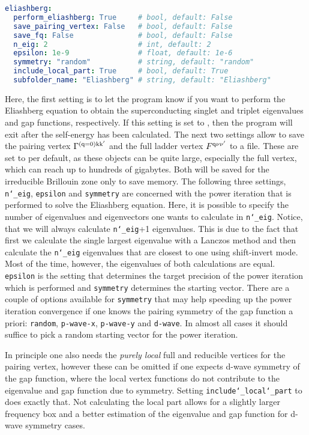 \documentclass[../../main.tex]{subfiles}
\begin{document}
\begin{minipage}{\textwidth}%
\begin{lstlisting}[language=yaml]
eliashberg:
  perform_eliashberg: True     # bool, default: False
  save_pairing_vertex: False   # bool, default: False
  save_fq: False               # bool, default: False
  n_eig: 2                     # int, default: 2
  epsilon: 1e-9                # float, default: 1e-6
  symmetry: "random"           # string, default: "random"
  include_local_part: True     # bool, default: True
  subfolder_name: "Eliashberg" # string, default: "Eliashberg"
\end{lstlisting}
\end{minipage}
Here, the first setting is to let the program know if you want to perform the Eliashberg equation to obtain the superconducting singlet and triplet eigenvalues and gap functions, respectively. If this setting is set to , then the program will exit after the self-energy has been calculated. The next two settings allow to save the pairing vertex $\Gamma^{(\text{q}=0)\text{k}\text{k}'}$ and the full ladder vertex $F^{\text{q}\nu\nu'}$ to a file. These are set to  per default, as these objects can be quite large, especially the full vertex, which can reach up to hundreds of gigabytes. Both will be saved for the irreducible Brillouin zone only to save memory. The following three settings, \texttt{n\char`_eig}, \texttt{epsilon} and \texttt{symmetry} are concerned with the power iteration that is performed to solve the Eliashberg equation. Here, it is possible to specify the number of eigenvalues and eigenvectors one wants to calculate in \texttt{n\char`_eig}. Notice, that we will always calculate \texttt{n\char`_eig}+1 eigenvalues. This is due to the fact that first we calculate the single largest eigenvalue with a Lanczos method and then calculate the \texttt{n\char`_eig} eigenvalues that are closest to one using shift-invert mode. Most of the time, however, the eigenvalues of both calculations are equal. \texttt{epsilon} is the setting that determines the target precision of the power iteration which is performed and \texttt{symmetry} determines the starting vector. There are a couple of options available for \texttt{symmetry} that may help speeding up the power iteration convergence if one knows the pairing symmetry of the gap function a priori: \texttt{random}, \texttt{p-wave-x}, \texttt{p-wave-y} and \texttt{d-wave}. In almost all cases it should suffice to pick a random starting vector for the power iteration. 

In principle one also needs the \textit{purely local} full and reducible vertices for the pairing vertex, however these can be omitted if one expects d-wave symmetry of the gap function, where the local vertex functions do not contribute to the eigenvalue and gap function due to symmetry. Setting \texttt{include\char`_local\char`_part} to  does exactly that. Not calculating the local part allows for a slightly larger frequency box and a better estimation of the eigenvalue and gap function for d-wave symmetry cases.
\end{document}
